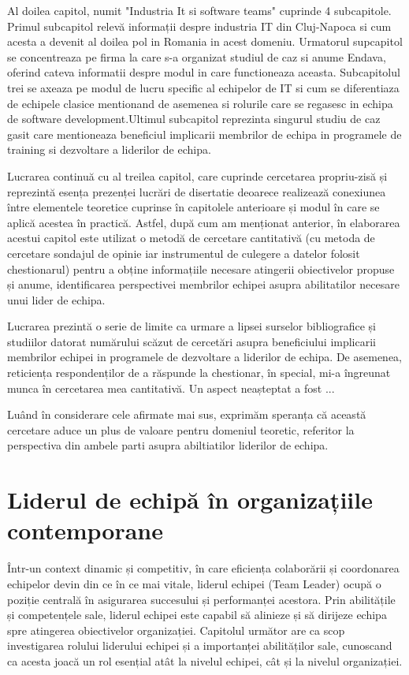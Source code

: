 \documentclass[a4paper, 12pt]{article}
\begin{document}
	\quad Al doilea capitol, numit "Industria It si software teams" cuprinde 4 subcapitole. Primul subcapitol relevă informații despre industria IT din Cluj-Napoca si cum acesta a devenit al doilea pol in Romania in acest domeniu. Urmatorul supcapitol se concentreaza pe firma la care s-a organizat studiul de caz si anume Endava, oferind cateva informatii despre modul in care functioneaza aceasta. Subcapitolul trei se axeaza pe modul de lucru specific al echipelor de IT si cum se diferentiaza de echipele clasice mentionand de asemenea si rolurile care se regasesc in echipa de software development.Ultimul subcapitol reprezinta singurul studiu de caz gasit care mentioneaza beneficiul implicarii membrilor de echipa in programele de training si dezvoltare a liderilor de echipa.

	\quad Lucrarea continuă cu al treilea capitol, care cuprinde cercetarea propriu-zisă și reprezintă esența prezenței lucrări de disertatie deoarece realizează conexiunea între elementele teoretice cuprinse în capitolele anterioare și modul în care se aplică acestea în practică. Astfel, după cum am menționat anterior, în elaborarea acestui capitol este utilizat o metodă de cercetare cantitativă (cu metoda de cercetare sondajul de opinie iar instrumentul de culegere a datelor folosit chestionarul) pentru a obține informațiile necesare atingerii obiectivelor propuse și anume, identificarea perspectivei membrilor echipei asupra abilitatilor necesare unui lider de echipa.

	\quad Lucrarea prezintă o serie de limite ca urmare a lipsei surselor bibliografice și studiilor datorat numărului scăzut  de cercetări asupra beneficiului implicarii membrilor echipei in programele de dezvoltare a liderilor de echipa. De asemenea, reticiența respondenților de a răspunde la chestionar, în special, mi-a îngreunat munca în cercetarea mea cantitativă. Un aspect neașteptat a fost ...

	\quad Luând în considerare cele afirmate mai sus, exprimăm speranța că această cercetare aduce un plus de valoare pentru domeniul teoretic, referitor la perspectiva din ambele parti asupra abiltiatilor liderilor de echipa.


\newpage
	\setcounter{section}{0}

	\section{Liderul de echipă în organizațiile contemporane}

\quad \quad\space Într-un context dinamic și competitiv, în care eficiența colaborării și coordonarea echipelor devin din ce în ce mai vitale, liderul echipei (Team Leader) ocupă o poziție centrală în asigurarea succesului și performanței acestora. Prin abilitățile și competențele sale, liderul echipei este capabil să alinieze și să dirijeze echipa spre atingerea obiectivelor organizației. Capitolul următor are ca scop investigarea rolului liderului echipei și a importanței abilităților sale, cunoscand ca acesta joacă un rol esențial atât la nivelul echipei, cât și la nivelul organizației.
\end{document}
